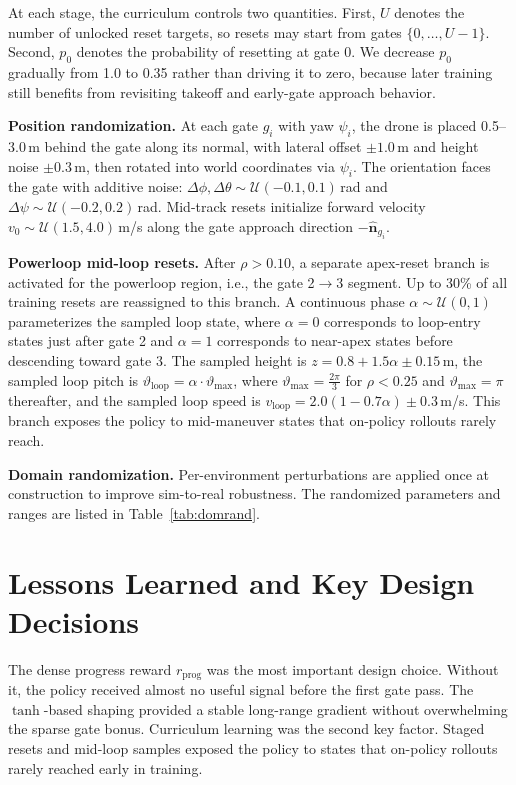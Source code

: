 \documentclass[conference]{IEEEtran}
\begin{document}
At each stage, the curriculum controls two quantities. First, $U$ denotes the number of unlocked reset targets, so resets may start from gates $\{0,\dots,U-1\}$. Second, $p_0$ denotes the probability of resetting at gate 0. We decrease $p_0$ gradually from 1.0 to 0.35 rather than driving it to zero, because later training still benefits from revisiting takeoff and early-gate approach behavior.

\textbf{Position randomization.}
At each gate $g_i$ with yaw $\psi_i$, the drone is placed 0.5--3.0\,m behind the gate along its normal, with lateral offset $\pm 1.0$\,m and height noise $\pm 0.3$\,m, then rotated into world coordinates via $\psi_i$. The orientation faces the gate with additive noise: $\Delta\phi, \Delta\theta \sim \mathcal{U}(-0.1, 0.1)$\,rad and $\Delta\psi \sim \mathcal{U}(-0.2, 0.2)$\,rad. Mid-track resets initialize forward velocity $v_0 \sim \mathcal{U}(1.5, 4.0)$\,m/s along the gate approach direction $-\hat{\mathbf{n}}_{g_i}$.

\textbf{Powerloop mid-loop resets.}
After $\rho > 0.10$, a separate apex-reset branch is activated for the powerloop region, i.e., the gate 2$\rightarrow$3 segment. Up to 30\% of all training resets are reassigned to this branch. A continuous phase $\alpha \sim \mathcal{U}(0, 1)$ parameterizes the sampled loop state, where $\alpha=0$ corresponds to loop-entry states just after gate 2 and $\alpha=1$ corresponds to near-apex states before descending toward gate 3. The sampled height is $z = 0.8 + 1.5\alpha \pm 0.15$\,m, the sampled loop pitch is $\vartheta_{\text{loop}} = \alpha \cdot \vartheta_{\max}$, where $\vartheta_{\max} = \frac{2\pi}{3}$ for $\rho < 0.25$ and $\vartheta_{\max} = \pi$ thereafter, and the sampled loop speed is $v_{\text{loop}} = 2.0(1-0.7\alpha) \pm 0.3$\,m/s. This branch exposes the policy to mid-maneuver states that on-policy rollouts rarely reach.

\textbf{Domain randomization.}
Per-environment perturbations are applied once at construction to improve sim-to-real robustness. The randomized parameters and ranges are listed in Table~\ref{tab:domrand}.

\section{Lessons Learned and Key Design Decisions}

The dense progress reward $r_{\text{prog}}$ was the most important design choice. Without it, the policy received almost no useful signal before the first gate pass. The $\tanh$-based shaping provided a stable long-range gradient without overwhelming the sparse gate bonus. Curriculum learning was the second key factor. Staged resets and mid-loop samples exposed the policy to states that on-policy rollouts rarely reached early in training.
\end{document}
